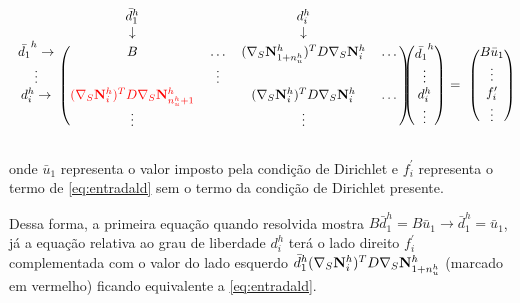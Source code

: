 \begin{equation} \label{eq:bigconst}
\begin{blockarray}{ccccc}
& \bar{d}_1^h &  & d_i ^h & & \\
& \downarrow &  & \downarrow & & \\
\begin{block}{c(cccc)}
\bar{d_1}^h \rightarrow & B & \hdots &  \kij{1+\freedomfine}{i}  & \hdots \\ 
\vdots                  &   & \vdots &             \\ 
d_i^h       \rightarrow &{ \color{red}\kij{i}{n_u^h + 1} }  &      & \kij{i}{i}   & \hdots \\
& \vdots &      & \vdots   &  \\
\end{block}
\end{blockarray} \begin{blockarray}{c}
 \\
 \\
\begin{block}{(c)}
\bar{d_1}^h \\
\vdots\\
d_i^h \\
\vdots  \\
\end{block}
\end{blockarray}\begin{blockarray}{c}
 \\
 \\
 \\
= \\
 \\
\end{blockarray} \begin{blockarray}{c}
 \\
 \\
\begin{block}{(c)}
 B \bar{u}_1 \\
\vdots\\
f^\prime_i \\
\vdots  \\
\end{block}
\end{blockarray}
\end{equation}


onde $\bar{u}_1$ representa o valor imposto pela condição de Dirichlet e $f^\prime_i$ representa o termo de \ref{eq:entradald} sem o termo da condição de Dirichlet presente. 

Dessa forma, a primeira equação quando resolvida mostra $B\bar{d}_1^h = B\bar{u}_1 \rightarrow \bar{d}_1^h = \bar{u}_1$, já a equação relativa ao grau de liberdade $d_i^h$ terá o lado direito $f^\prime_i$ complementada com o valor do lado esquerdo $\bar{d}_1^h (\nabla_S {\mathbf{N}_{i}^h})^T D \nabla_S {\mathbf{N}_{1+n_u^h}^h}$ (marcado em vermelho) ficando equivalente a \eqref{eq:entradald}.

